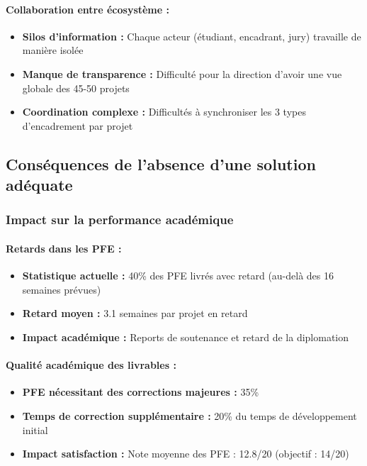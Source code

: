 \paragraph{Collaboration entre écosystème :}
\begin{itemize}
    \item \textbf{Silos d'information :} Chaque acteur (étudiant, encadrant, jury) travaille de manière isolée
    \item \textbf{Manque de transparence :} Difficulté pour la direction d'avoir une vue globale des 45-50 projets
    \item \textbf{Coordination complexe :} Difficultés à synchroniser les 3 types d'encadrement par projet
\end{itemize}

\subsection{Conséquences de l'absence d'une solution adéquate}

\subsubsection{Impact sur la performance académique}

\paragraph{Retards dans les PFE :}
\begin{itemize}
    \item \textbf{Statistique actuelle :} 40\% des PFE livrés avec retard (au-delà des 16 semaines prévues)
    \item \textbf{Retard moyen :} 3.1 semaines par projet en retard
    \item \textbf{Impact académique :} Reports de soutenance et retard de la diplomation
\end{itemize}

\paragraph{Qualité académique des livrables :}
\begin{itemize}
    \item \textbf{PFE nécessitant des corrections majeures :} 35\%
    \item \textbf{Temps de correction supplémentaire :} 20\% du temps de développement initial
    \item \textbf{Impact satisfaction :} Note moyenne des PFE : 12.8/20 (objectif : 14/20)
\end{itemize}

